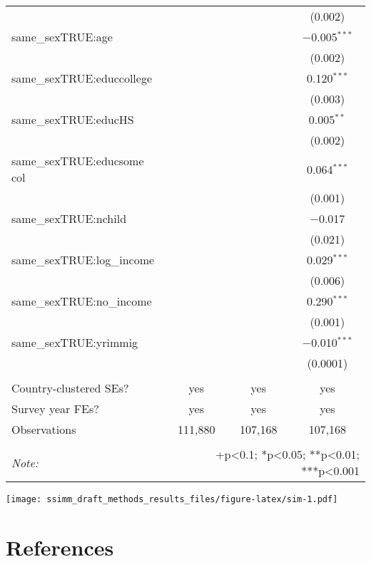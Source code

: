 \documentclass[11pt,]{article}
\begin{document}
\begin{table}[!htbp]
\begin{tabular}{@{\extracolsep{5pt}}lccc}
  &  &  & (0.002) \\ 
  same\_sexTRUE:age &  &  & $-$0.005$^{***}$ \\ 
  &  &  & (0.002) \\ 
  same\_sexTRUE:educcollege &  &  & 0.120$^{***}$ \\ 
  &  &  & (0.003) \\ 
  same\_sexTRUE:educHS &  &  & 0.005$^{**}$ \\ 
  &  &  & (0.002) \\ 
  same\_sexTRUE:educsome col &  &  & 0.064$^{***}$ \\ 
  &  &  & (0.001) \\ 
  same\_sexTRUE:nchild &  &  & $-$0.017 \\ 
  &  &  & (0.021) \\ 
  same\_sexTRUE:log\_income &  &  & 0.029$^{***}$ \\ 
  &  &  & (0.006) \\ 
  same\_sexTRUE:no\_income &  &  & 0.290$^{***}$ \\ 
  &  &  & (0.001) \\ 
  same\_sexTRUE:yrimmig &  &  & $-$0.010$^{***}$ \\ 
  &  &  & (0.0001) \\ 
 \hline \\[-1.8ex] 
Country-clustered SEs? & yes & yes & yes \\ 
Survey year FEs? & yes & yes & yes \\ 
Observations & 111,880 & 107,168 & 107,168 \\ 
\hline 
\hline \\[-1.8ex] 
\textit{Note:}  & \multicolumn{3}{r}{+p<0.1; *p<0.05; **p<0.01; ***p<0.001} \\ 
\end{tabular} 
\end{table}

\texttt{[image: ssimm\_draft\_methods\_results\_files/figure-latex/sim-1.pdf]}

\hypertarget{references}{%
\section{References}\label{references}}

\setlength{\parindent}{-0.2in}
\setlength{\leftskip}{0.2in}
\setlength{\parskip}{8pt}

\noindent

\newpage
\singlespacing 
\end{document}
